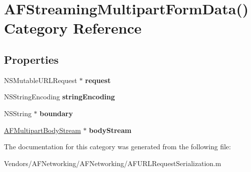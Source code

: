 \hypertarget{category_a_f_streaming_multipart_form_data_07_08}{}\section{A\+F\+Streaming\+Multipart\+Form\+Data() Category Reference}
\label{category_a_f_streaming_multipart_form_data_07_08}
\subsection*{Properties}
\begin{DoxyCompactItemize}
\item 
\hypertarget{category_a_f_streaming_multipart_form_data_07_08_a2d0be87dd88432deeb33e4dfea850e48}{}N\+S\+Mutable\+U\+R\+L\+Request $\ast$ {\bfseries request}\label{category_a_f_streaming_multipart_form_data_07_08_a2d0be87dd88432deeb33e4dfea850e48}

\item 
\hypertarget{category_a_f_streaming_multipart_form_data_07_08_aad982e1c61bf6c3416c3e4596dfdf07b}{}N\+S\+String\+Encoding {\bfseries string\+Encoding}\label{category_a_f_streaming_multipart_form_data_07_08_aad982e1c61bf6c3416c3e4596dfdf07b}

\item 
\hypertarget{category_a_f_streaming_multipart_form_data_07_08_a4a37ad8cc6df9b5d14f0bf0c08e3f92e}{}N\+S\+String $\ast$ {\bfseries boundary}\label{category_a_f_streaming_multipart_form_data_07_08_a4a37ad8cc6df9b5d14f0bf0c08e3f92e}

\item 
\hypertarget{category_a_f_streaming_multipart_form_data_07_08_a41a2435c709facb4f2ae4e6ac644088e}{}\hyperlink{interface_a_f_multipart_body_stream}{A\+F\+Multipart\+Body\+Stream} $\ast$ {\bfseries body\+Stream}\label{category_a_f_streaming_multipart_form_data_07_08_a41a2435c709facb4f2ae4e6ac644088e}

\end{DoxyCompactItemize}


The documentation for this category was generated from the following file\+:\begin{DoxyCompactItemize}
\item 
Vendors/\+A\+F\+Networking/\+A\+F\+Networking/A\+F\+U\+R\+L\+Request\+Serialization.\+m\end{DoxyCompactItemize}
